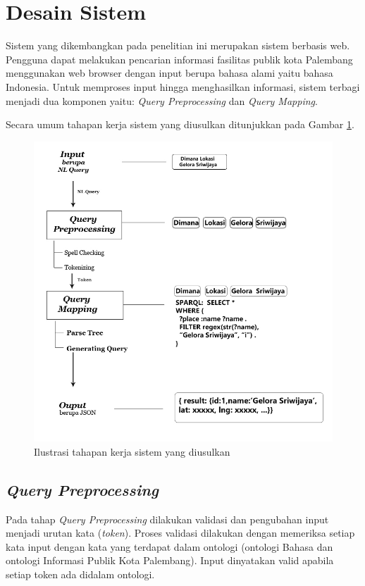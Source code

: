 	\section{Desain Sistem}
	Sistem yang dikembangkan pada penelitian ini merupakan sistem berbasis web. Pengguna dapat melakukan pencarian informasi fasilitas publik kota Palembang  menggunakan web browser dengan input berupa bahasa alami yaitu bahasa Indonesia. Untuk memproses input hingga menghasilkan informasi, sistem terbagi menjadi dua komponen yaitu: \emph{Query Preprocessing} dan \emph{Query Mapping}. 
	
	Secara umum tahapan kerja sistem yang diusulkan ditunjukkan pada Gambar \ref{fig:arsitektur}.
	
	\begin{figure}[H]
		\centering
		\includegraphics[scale=0.50]{gambar/arsitektur.png}
		\caption{Ilustrasi tahapan kerja sistem yang diusulkan}
		\label{fig:arsitektur}
	\end{figure}
	
	
	\subsection{\emph{Query Preprocessing}}
	Pada tahap \emph{Query Preprocessing} dilakukan validasi dan pengubahan input menjadi urutan kata (\emph{token}). Proses validasi dilakukan dengan memeriksa setiap kata input dengan kata yang terdapat dalam ontologi (ontologi Bahasa dan ontologi Informasi Publik Kota Palembang). Input dinyatakan valid apabila setiap token ada didalam ontologi. 
	
